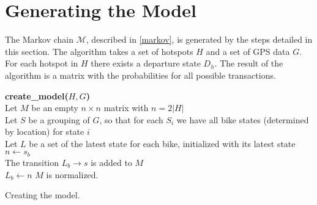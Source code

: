 \section{Generating the Model}\label{sec:generatemarkov}
The Markov chain $\mathcal{M}$, described in \cref{markov}, is generated by the steps detailed in this section.
The algorithm takes a set of hotspots $H$ and a set of GPS data $G$. For each hotspot in $H$ there exists a departure state $D_h$.
The result of the algorithm is a matrix with the probabilities for all possible transactions.

\begin{algorithm}[H]
\textbf{create\_model($H, G$)} \\
Let $M$ be an empty $n \times n$ matrix with $n = 2|H|$ \\
Let $S$ be a grouping of $G$, so that for each $S_i$ we have all bike states (determined by location) for state $i$\\
Let $L$ be a set of the latest state for each bike, initialized with its latest state\\
  {
    {$n \leftarrow s_b$\\
    The transition $L_b \rightarrow s$ is added to $M$\\
     $L_b \leftarrow n$}}
$M$ is normalized.\\
\caption{Creating the model.}
\label{markov:create_model}
\end{algorithm}